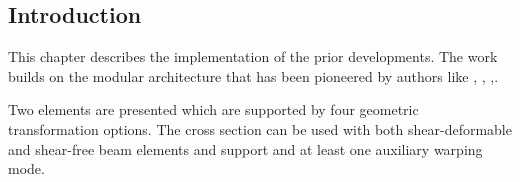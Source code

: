 

\subsection{Introduction}


This chapter describes the implementation of the prior developments. 
The work builds on the modular architecture that has been pioneered by authors like  \cite{filippou1996fedeas}, \cite{desouza2000forcebased}, 
\cite{lecorvec2012nonlinear},\cite{scott2008softwarea}. 

Two elements are presented which are supported by four geometric transformation options. 
The cross section can be used with both shear-deformable and shear-free beam elements and support and at least one
auxiliary warping mode.





\iffalse
